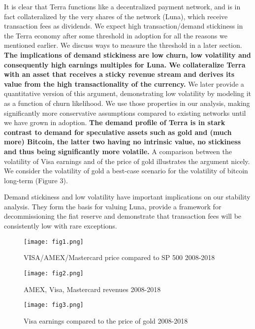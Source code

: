 \documentclass{article}
\begin{document}
It is clear that Terra functions like a decentralized payment network, and is in fact collateralized by the very shares of the network (Luna), which receive transaction fees as dividends. We expect high transaction/demand stickiness in the Terra economy after some threshold in adoption for all the reasons we mentioned earlier. We discuss ways to measure the threshold in a later section.  \textbf{The implications of demand stickiness are low churn, low volatility and consequently high earnings multiples for Luna. We collateralize Terra with an asset that receives a sticky revenue stream and derives its value from the high transactionality of the currency.} We later provide a quantitative version of this argument, demonstrating low volatility by modeling it as a function of churn likelihood. We use those properties in our analysis, making significantly more conservative assumptions compared to existing networks until we have grown in adoption. \textbf{The demand profile of Terra is in stark contrast to demand for speculative assets such as gold and (much more) Bitcoin, the latter two having no intrinsic value, no stickiness and thus being significantly more volatile.} A comparison between the volatility of Visa earnings and of the price of gold illustrates the argument nicely.  We consider the volatility of gold a best-case scenario for the volatility of bitcoin long-term (Figure 3).

Demand stickiness and low volatility have important implications on our stability analysis. They form the basis for valuing Luna, provide a framework for decommissioning the fiat reserve and demonstrate that transaction fees will be consistently low with rare exceptions.



\begin{figure}
	\centering
	\texttt{[image: fig1.png]}
	\caption[]
	{VISA/AMEX/Mastercard price compared to SP 500 2008-2018}
\end{figure}


\begin{figure}
	\centering
	\texttt{[image: fig2.png]}
	\caption[]
	{AMEX, Visa, Mastercard revenues 2008-2018}
\end{figure}

\begin{figure}
	\centering
	\texttt{[image: fig3.png]}
	\caption[]
	{Visa earnings compared to the price of gold 2008-2018}
\end{figure}
\end{document}
